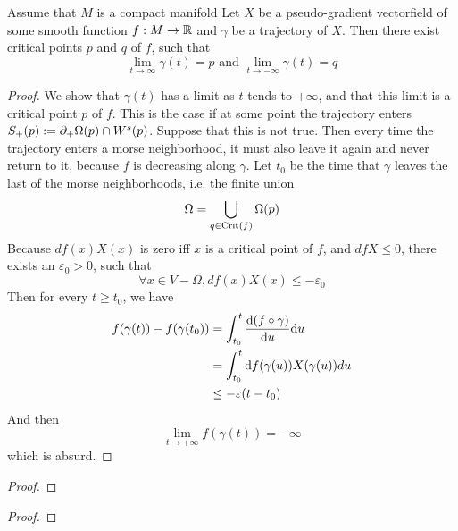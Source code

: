 \begin{prop}
    Assume that $M$ is a compact manifold Let $X$ be a pseudo-gradient vectorfield of some
    smooth function $f: M \to \R$ and $\gamma$ be a trajectory of $X$. Then there
    exist critical points $p$ and $q$ of $f$, such that
    \[ \lim_{t \to \infty} \gamma(t) = p \text{ and } \lim_{t \to -\infty} \gamma(t) = q \]
\end{prop}

\begin{proof}
    We show that $\gamma(t)$ has a limit as $t$ tends to $+ \infty$, and that this limit is
    a critical point $p$ of $f$. This is the case if at some point the trajectory enters 
    $S_+(p) := \del_+ \Omega(p) \cap \stab(p)$. Suppose that this is not true. Then every time 
    the trajectory enters a morse neighborhood, it must also leave it again and never return to
    it, because $f$ is decreasing along $\gamma$. Let $t_0$ be the time that $\gamma$ leaves the
    last of the morse neighborhoods, i.e. the finite union
    \[ \Omega = \bigcup_{q \in \Crit(f)} \Omega(p) \]
    Because $df(x)X(x)$ is zero iff $x$ is a critical point of $f$, and $dfX \leq 0$, there 
    exists an $\varepsilon_0 > 0$, such that 
    \[ \forall x \in V - \Omega, df(x)X(x) \leq - \varepsilon_0 \]
    Then for every $t \geq t_0$, we have 
    \begin{align*}
        f(\gamma(t)) - f(\gamma(t_0)) &= \int_{t_0}^t \derive[(f \circ \gamma)]{u} \opd u \\
        &= \int_{t_0}^t \opd f (\gamma(u))X(\gamma(u))du \\
        &\leq - \varepsilon (t - t_0)
    \end{align*}
    And then 
    \[ \lim_{t \to +\infty} f(\gamma(t)) = - \infty \]
    which is absurd.
\end{proof}

\begin{theorem}
\end{theorem}

\begin{proof}
\end{proof}

\begin{theorem}
\end{theorem}

\begin{proof}
\end{proof}

